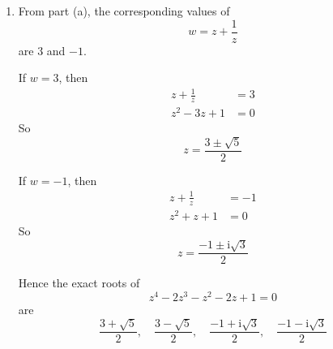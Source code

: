 \documentclass[leqno]{article}
\begin{document}
\begin{enumerate}[
  label=\textbf{\arabic*.},
  leftmargin=*,
  topsep=0pt,
  partopsep=0pt,
  parsep=0pt
]
\begin{tcolorbox}[colback=white, colframe=scarlet, title={\textbf{Solution}}, breakable, grow to left by=6mm, grow to right by=10mm]
\begin{enumerate}[label=\textbf{(\alph*)}]
Since the constant term is $1$, no root is $0$, so we may divide by $z^2$:
\begin{align*}
z^2-2z-1-\frac{2}{z}+\frac{1}{z^2}&=0 \\
\left(z^2+\frac{1}{z^2}\right)-2\left(z+\frac{1}{z}\right)-1&=0
\end{align*}

Now let
\[
w=z+\frac{1}{z}
\]
Then
\[
z^2+\frac{1}{z^2}=\left(z+\frac{1}{z}\right)^2-2=w^2-2
\]
so
\begin{align*}
(w^2-2)-2w-1&=0 \\
w^2-2w-3&=0 \\
(w-3)(w+1)&=0
\end{align*}

So the possible values of $w$ are $3$ and $-1$.

Also, the polynomial is unchanged when its coefficients are reversed, so if $z$ is a root then $\frac1z$ is also a root. Therefore the four roots $\alpha,\beta,\gamma,\delta$ occur in reciprocal pairs, and the four values
\[
\alpha+\frac1\alpha,\quad \beta+\frac1\beta,\quad \gamma+\frac1\gamma,\quad \delta+\frac1\delta
\]
are
\[
3,3,-1,-1
\]

Hence the required quartic is
\begin{align*}
(w-3)^2(w+1)^2&=(w^2-2w-3)^2 \\
&=w^4-4w^3-2w^2+12w+9
\end{align*}

So the quartic equation is
\[
w^4-4w^3-2w^2+12w+9=0
\]

  \item From part (a), the corresponding values of
\[
w=z+\frac1z
\]
are $3$ and $-1$.

If $w=3$, then
\begin{align*}
z+\frac1z&=3 \\
z^2-3z+1&=0
\end{align*}
So
\[
z=\frac{3\pm\sqrt5}{2}
\]

If $w=-1$, then
\begin{align*}
z+\frac1z&=-1 \\
z^2+z+1&=0
\end{align*}
So
\[
z=\frac{-1\pm \mathrm{i}\sqrt3}{2}
\]

Hence the exact roots of
\[
z^4-2z^3-z^2-2z+1=0
\]
are
\[
\frac{3+\sqrt5}{2},\quad \frac{3-\sqrt5}{2},\quad \frac{-1+\mathrm{i}\sqrt3}{2},\quad \frac{-1-\mathrm{i}\sqrt3}{2}
\]
\end{enumerate}
\end{tcolorbox}



\end{enumerate}
\end{document}
